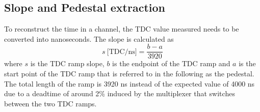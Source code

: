 \documentclass{JINST}
\begin{document}
\subsection{Slope and Pedestal extraction}

To reconstruct the time in a channel, the TDC value measured needs to be converted into nanoseconds. The slope is calculated as
\begin{equation} \label{eq:slope}
  s \: \text{[TDC/ns]} = \frac{b - a}{3920}
\end{equation}
where $s$ is the TDC ramp slope, $b$ is the endpoint of the TDC ramp and $a$ is the start point of the TDC ramp that is referred to in the following as the pedestal. The total length of the ramp is 3920 ns instead of the expected value of 4000 ns due to a deadtime of around 2\% \cite{Brianne2012} induced by the multiplexer that switches between the two TDC ramps.
\end{document}
